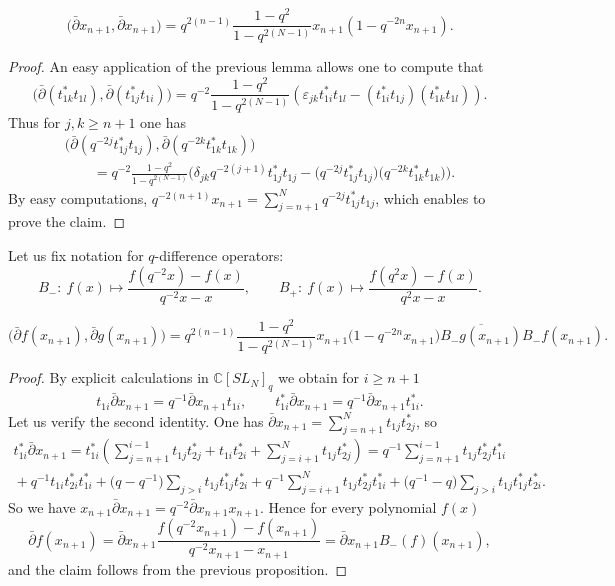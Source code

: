 \documentclass[pdftex]{sigma}
\begin{document}
\begin{proposition}
\[
\big(\bar \partial x_{n+1}, \bar \partial x_{n+1}\big)= q^{2(n-1)} \frac{1-q^2}{1-q^{2(N-1)}}
x_{n+1}(1-q^{-2n}x_{n+1}).
\]
\end{proposition}

\begin{proof} An easy application of the previous lemma allows one to compute that
\[
\big(\bar \partial (t_{1k}^*t_{1l}), \bar \partial
(t_{1j}^*t_{1i})\big)=q^{-2}\frac{1-q^2}{1-q^{2(N-1)}}(\varepsilon_{jk}t_{1i}^*t_{1l}-(t_{1i}^*t_{1j})(t_{1k}^*t_{1l})).
\]
Thus for $j,k \geq n+1$ one has
\begin{gather*}
\big(\bar \partial (q^{-2j}t_{1j}^*t_{1j}), \bar \partial
(q^{-2k}t_{1k}^*t_{1k})\big)\\
\qquad{} =q^{-2}\frac{1-q^2}{1-q^{2(N-1)}}\big(\delta_{jk}q^{-2(j+1)}t_{1j}^*t_{1j}
-\big(q^{-2j}t_{1j}^*t_{1j}\big)\big(q^{-2k}t_{1k}^*t_{1k}\big)\big).
\end{gather*}
By easy computations, $q^{-2(n+1)}x_{n+1}=\sum\limits_{j=n+1}^N q^{-2j}t_{1j}^*t_{1j}$, which enables to prove the
claim.
\end{proof}

Let us f\/ix notation for $q$-dif\/ference operators:
\[
B_-: \ f(x) \mapsto \frac{f(q^{-2}x)-f(x)}{q^{-2}x-x}, \qquad B_+: \ f(x) \mapsto \frac{f(q^2x)-f(x)}{q^2x-x}.
\]
\begin{lemma}\label{lem_dbar}
\[
\big(\bar \partial f(x_{n+1}), \bar \partial g(x_{n+1})\big)= q^{2(n-1)} \frac{1-q^2}{1-q^{2(N-1)}} x_{n+1}
\big(1-q^{-2n}x_{n+1}\big) \overline{B_-g(x_{n+1})} B_-f(x_{n+1}).
\]
\end{lemma}
\begin{proof} By explicit calculations in $\mathbb C[SL_N]_q$ we obtain for $i \geq n+1$
\[
t_{1i}\bar \partial x_{n+1}= q^{-1} \bar \partial x_{n+1} t_{1i}, \qquad t_{1i}^* \bar \partial
x_{n+1}=q^{-1} \bar
\partial x_{n+1} t_{1i}^*.
\]
Let us verify the second identity. One has $\bar \partial x_{n+1}=\sum\limits_{j=n+1}^Nt_{1j}t_{2j}^*$, so
\begin{gather*}
t_{1i}^*\bar \partial x_{n+1}=t_{1i}^*  \left(\sum_{j=n+1}^{i-1}
t_{1j}t_{2j}^*+t_{1i}t_{2i}^*+\sum_{j=i+1}^Nt_{1j}t_{2j}^*\right) = q^{-1} \sum_{j=n+1}^{i-1}t_{1j}t_{2j}^*
  t_{1i}^*
\\
{}
+q^{-1}t_{1i}t_{2i}^*t_{1i}^*+\big(q-q^{-1}\big)\sum_{j>i}t_{1j}t_{1j}^*t_{2i}^*+q^{-1}\sum_{j=i+1}^N
t_{1j}t_{2j}^*t_{1i}^*+\big(q^{-1}-q\big)\sum_{j>i}t_{1j}t_{1j}^*t_{2i}^*.
\end{gather*}
So we have $x_{n+1}\bar \partial x_{n+1}=q^{-2} \bar
\partial x_{n+1} x_{n+1}$. Hence for every polynomial $f(x)$
\[
\bar \partial f(x_{n+1})=\bar \partial x_{n+1}\frac{f(q^{-2}x_{n+1})-f(x_{n+1})}{q^{-2}x_{n+1}-x_{n+1}}=\bar
\partial x_{n+1} B_-(f)(x_{n+1}),
\]
and  the claim follows from the previous proposition. \end{proof}
\end{document}
